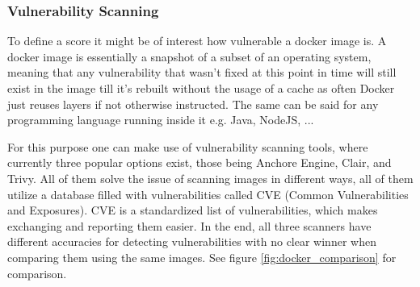 \subsubsection{Vulnerability Scanning}
To define a score it might be of interest how vulnerable a docker image is. A docker image is essentially a snapshot of a subset of an operating system, meaning that any vulnerability that wasn't fixed at this point in time will still exist in the image till it's rebuilt without the usage of a cache as often Docker just reuses layers if not otherwise instructed. The same can be said for any programming language running inside it e.g. Java, NodeJS, ...

For this purpose one can make use of vulnerability scanning tools, where currently three popular options exist, those being Anchore Engine, Clair, and Trivy. 
All of them solve the issue of scanning images in different ways, all of them utilize a database filled with vulnerabilities called CVE (Common Vulnerabilities and Exposures). CVE is a standardized list of vulnerabilities, which makes exchanging and reporting them easier.
In the end, all three scanners have different accuracies for detecting vulnerabilities with no clear winner when comparing them using the same images. See figure \ref{fig:docker_comparison} for comparison. 

